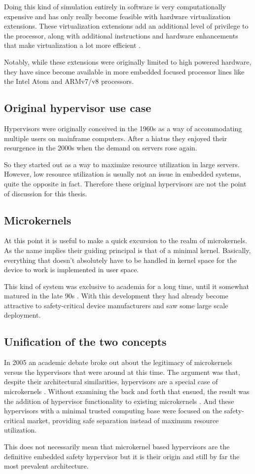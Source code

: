 Doing this kind of simulation entirely in software is very computationally expensive and has only really become feasible with hardware virtualization extensions. These virtualization extensions add an additional level of privilege to the processor, along with additional instructions and hardware enhancements that make virtualization a lot more efficient \cite{ARM.v8.2018}.

Notably, while these extensions were originally limited to high powered hardware, they have since become available in more embedded focused processor lines like the Intel Atom and ARMv7/v8 processors.
\subsection{Original hypervisor use case}
Hypervisors were originally conceived in the 1960s as a way of accommodating multiple users on mainframe computers. After a hiatus they enjoyed their resurgence in the 2000s when the demand on servers rose again. 

So they started out as a way to maximize resource utilization in large servers. However, low resource utilization is usually not an issue in embedded systems, quite the opposite in fact. Therefore these original hypervisors are not the point of discussion for this thesis.
\subsection{Microkernels}
At this point it is useful to make a quick excursion to the realm of microkernels. As the name implies their guiding principal is that of a minimal kernel. Basically, everything that doesn't absolutely have to be handled in kernel space for the device to work is implemented in user space.

This kind of system was exclusive to academia for a long time, until it somewhat matured in the late 90s \cite{Liedtke.1995}\cite{Liedtke.1996}. With this development they had already become attractive to safety-critical device manufacturers and saw some large scale deployment.

\subsection{Unification of the two concepts}
In 2005 an academic debate broke out about the legitimacy of microkernels versus the hypervisors that were around at this time. 
The argument was that, despite their architectural similarities, hypervisors are a special case of microkernels  \cite{StevenHand.2005}\cite{Heiser.2006}. Without examining the back and forth that ensued, the result was the addition of hypervisor functionality to existing microkernels \cite{Heiser.2010}. And these hypervisors with a minimal trusted computing base were focused on the safety-critical market, providing safe separation instead of maximum resource utilization.

This does not necessarily mean that microkernel based hypervisors are the definitive embedded safety hypervisor but it is their origin and still by far the most prevalent architecture.


